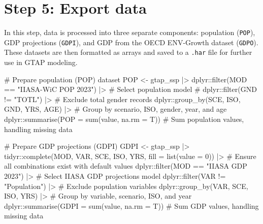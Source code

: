 \documentclass[
  letterpaper,
  DIV=11,
  numbers=noendperiod]{scrartcl}
\newenvironment{Shaded}{}{}
\newcommand{\AttributeTok}[1]{\textcolor[rgb]{0.00,0.34,0.68}{#1}}
\newcommand{\CommentTok}[1]{\textcolor[rgb]{0.54,0.53,0.53}{#1}}
\newcommand{\DecValTok}[1]{\textcolor[rgb]{0.69,0.50,0.00}{#1}}
\newcommand{\FunctionTok}[1]{\textcolor[rgb]{0.39,0.29,0.61}{#1}}
\newcommand{\NormalTok}[1]{\textcolor[rgb]{0.12,0.11,0.11}{#1}}
\newcommand{\OtherTok}[1]{\textcolor[rgb]{0.00,0.43,0.16}{#1}}
\newcommand{\SpecialCharTok}[1]{\textcolor[rgb]{0.24,0.68,0.91}{#1}}
\newcommand{\StringTok}[1]{\textcolor[rgb]{0.75,0.01,0.01}{#1}}
\begin{document}
\section{Step 5: Export data}\label{step-5-export-data}

In this step, data is processed into three separate components:
population (\texttt{POP}), GDP projections (\texttt{GDPI}), and GDP from
the OECD ENV-Growth dataset (\texttt{GDPO}). These datasets are then
formatted as arrays and saved to a \texttt{.har} file for further use in
GTAP modeling.

\begin{Shaded}
\begin{Highlighting}[]
\CommentTok{\# Prepare population (POP) dataset}
\NormalTok{POP }\OtherTok{\textless{}{-}}\NormalTok{ gtap\_ssp }\SpecialCharTok{|\textgreater{}}
\NormalTok{   dplyr}\SpecialCharTok{::}\FunctionTok{filter}\NormalTok{(MOD }\SpecialCharTok{==} \StringTok{"IIASA{-}WiC POP 2023"}\NormalTok{) }\SpecialCharTok{|\textgreater{}}               \CommentTok{\# Select population model}
  \CommentTok{\# dplyr::filter(GND != "TOTL") |\textgreater{}                             \# Exclude total gender records}
\NormalTok{  dplyr}\SpecialCharTok{::}\FunctionTok{group\_by}\NormalTok{(SCE, ISO, GND, YRS, AGE) }\SpecialCharTok{|\textgreater{}}                \CommentTok{\# Group by scenario, ISO, gender, year, and age}
\NormalTok{  dplyr}\SpecialCharTok{::}\FunctionTok{summarise}\NormalTok{(}\AttributeTok{POP =} \FunctionTok{sum}\NormalTok{(value, }\AttributeTok{na.rm =}\NormalTok{ T))                 }\CommentTok{\# Sum population values, handling missing data}

\CommentTok{\# Prepare GDP projections (GDPI)}
\NormalTok{GDPI }\OtherTok{\textless{}{-}}\NormalTok{ gtap\_ssp }\SpecialCharTok{|\textgreater{}} 
\NormalTok{  tidyr}\SpecialCharTok{::}\FunctionTok{complete}\NormalTok{(MOD, VAR, SCE, ISO, YRS, }\AttributeTok{fill =} \FunctionTok{list}\NormalTok{(}\AttributeTok{value =} \DecValTok{0}\NormalTok{)) }\SpecialCharTok{|\textgreater{}} \CommentTok{\# Ensure all combinations exist with default values}
\NormalTok{  dplyr}\SpecialCharTok{::}\FunctionTok{filter}\NormalTok{(MOD }\SpecialCharTok{==} \StringTok{"IIASA GDP 2023"}\NormalTok{) }\SpecialCharTok{|\textgreater{}}                         \CommentTok{\# Select IIASA GDP projections model}
\NormalTok{  dplyr}\SpecialCharTok{::}\FunctionTok{filter}\NormalTok{(VAR }\SpecialCharTok{!=} \StringTok{"Population"}\NormalTok{) }\SpecialCharTok{|\textgreater{}}                             \CommentTok{\# Exclude population variables}
\NormalTok{  dplyr}\SpecialCharTok{::}\FunctionTok{group\_by}\NormalTok{(VAR, SCE, ISO, YRS) }\SpecialCharTok{|\textgreater{}}                            \CommentTok{\# Group by variable, scenario, ISO, and year}
\NormalTok{  dplyr}\SpecialCharTok{::}\FunctionTok{summarise}\NormalTok{(}\AttributeTok{GDPI =} \FunctionTok{sum}\NormalTok{(value, }\AttributeTok{na.rm =}\NormalTok{ T))                      }\CommentTok{\# Sum GDP values, handling missing data}


\end{Highlighting}
\end{Shaded}
\end{document}
